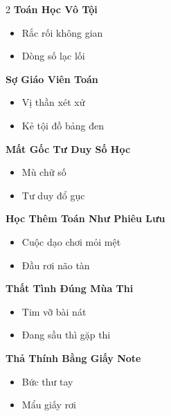 \begin{multicols}{2}
\vspace{0.8em}
\textbf{\color{chapterline}Toán Học Vô Tội}
\begin{itemize}[leftmargin=1.2em, itemsep=0.1em, label=\textcolor{titlecolor}{\tiny$\blacksquare$}]
  \item Rắc rối không gian
  \item Dòng số lạc lối
\end{itemize}
\vspace{0.8em}
\textbf{\color{chapterline}Sợ Giáo Viên Toán}
\begin{itemize}[leftmargin=1.2em, itemsep=0.1em, label=\textcolor{titlecolor}{\tiny$\blacksquare$}]
  \item Vị thần xét xử
  \item Kẻ tội đồ bảng đen
\end{itemize}
\vspace{0.8em}
\textbf{\color{chapterline}Mất Gốc Tư Duy Số Học}
\begin{itemize}[leftmargin=1.2em, itemsep=0.1em, label=\textcolor{titlecolor}{\tiny$\blacksquare$}]
  \item Mù chữ số
  \item Tư duy đổ gục
\end{itemize}
\vspace{0.8em}
\textbf{\color{chapterline}Học Thêm Toán Như Phiêu Lưu}
\begin{itemize}[leftmargin=1.2em, itemsep=0.1em, label=\textcolor{titlecolor}{\tiny$\blacksquare$}]
  \item Cuộc dạo chơi mỏi mệt
  \item Đầu rơi não tàn
\end{itemize}
\vspace{0.8em}
\textbf{\color{chapterline}Thất Tình Đúng Mùa Thi}
\begin{itemize}[leftmargin=1.2em, itemsep=0.1em, label=\textcolor{titlecolor}{\tiny$\blacksquare$}]
  \item Tim vỡ bài nát
  \item Đang sầu thì gặp thi
\end{itemize}
\vspace{0.8em}
\textbf{\color{chapterline}Thả Thính Bằng Giấy Note}
\begin{itemize}[leftmargin=1.2em, itemsep=0.1em, label=\textcolor{titlecolor}{\tiny$\blacksquare$}]
  \item Bức thư tay
  \item Mẩu giấy rơi
\end{itemize}
\vspace{0.8em}

\end{multicols}
